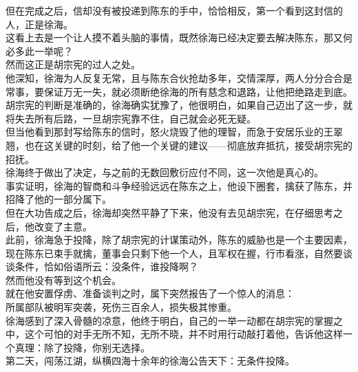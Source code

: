 \begin{multicols}{\theparacolNo}
但在完成之后，信却没有被投递到陈东的手中，恰恰相反，第一个看到这封信的人，正是徐海。\\

这看上去是一个让人摸不着头脑的事情，既然徐海已经决定要去解决陈东，那又何必多此一举呢？\\

然而这正是胡宗宪的过人之处。\\

他深知，徐海为人反复无常，且与陈东合伙抢劫多年，交情深厚，两人分分合合是常事，要保证万无一失，就必须断绝徐海的所有慈念和退路，让他把绝路走到底。\\

胡宗宪的判断是准确的，徐海确实犹豫了，他很明白，如果自己迈出了这一步，就将失去所有后路，一旦胡宗宪靠不住，自己就会必死无疑。\\

但当他看到那封写给陈东的信时，怒火烧毁了他的理智，而急于安居乐业的王翠翘，也在这关键的时刻，给了他一个关键的建议——彻底放弃抵抗，接受胡宗宪的招抚。\\

徐海终于做出了决定，与之前的无数回敷衍应付不同，这一次他是真心的。\\

事实证明，徐海的智商和斗争经验远远在陈东之上，他设下圈套，擒获了陈东，并招降了他的一部分属下。\\

但在大功告成之后，徐海却突然平静了下来，他没有去见胡宗宪，在仔细思考之后，他改变了主意。\\

此前，徐海急于投降，除了胡宗宪的计谋策动外，陈东的威胁也是一个主要因素，现在陈东已束手就擒，董事会只剩下他一个人，且军权在握，行市看涨，自然要谈谈条件，恰如俗语所云：没条件，谁投降啊？\\

然而他没有等到这个机会。\\

就在他安置俘虏、准备谈判之时，属下突然报告了一个惊人的消息：\\

所属部队被明军突袭，死伤三百余人，损失极其惨重。\\

徐海感到了深入骨髓的凉意，他终于明白，自己的一举一动都在胡宗宪的掌握之中，这个可怕的对手无所不知，无所不晓，并不时用行动敲打着他，告诉他这样一个真理：除了投降，你别无选择。\\

第二天，闯荡江湖，纵横四海十余年的徐海公告天下：无条件投降。\\


\end{multicols}
